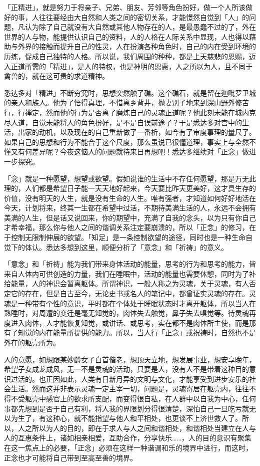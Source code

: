 \documentclass[twoside,openany]{book}
\begin{document}
「正精进」，就是努力于将亲子、兄弟、朋友、芳邻等角色扮好，做一个人所该做好的事，人往往要经由大自然和人类之间的密切关系，才能憬然自觉到「人」的问题，凡认为除了自己就没有大自然或其他人物存在的人，是最愚蠢不过的了，外在世界的人与物，能提供认识自己的资料，人的人格在人际关系中显现，人也得以藉助与外界的接触而提升自己的性灵，人在扮演各种角色时，自己的内在受到环境的历练，促成自己独特的人格。所以说，我们周围的种种，都是上天慈悲的恩赐，迈入正道所需的「精进」，是人的特权，也是神明的恩惠，人之所以为人，且不同于禽兽的，就在这可贵的求道精神。

悉达多对「精进」不断穷究时，思想突然触了礁。这个礁石，就是留在迦毗罗卫城的亲人和族人。他为了悟得真理，不惜离乡背井，抛妻别子地来到深山野外修苦行，行禅定，然而他的行为是否离了磨炼自己的灵魂正道呢？他此刻未能在城内克尽人道，自觉未能将人的角色扮好，是不是自误前途了？于是悉达多对宫中的生活，出家的动机，以及现在的自己重新做了一番析，如今有了审度事理的量尺了。如果自己的思想和行为不能合于这个尺度，那么虽说已很懂道理，事实上与全然不懂又有何差异呢？今夜这恼人的问题就待来日再想吧！悉达多继续对「正念」做进一步探究。

「念」就是一种愿望，想望或欲望。假如说谁的生活中不存任何愿望，那是万无此理的，人们都是希望日子能一天天地好起来，今天要比昨天更美好，这才具生存的价值，没有明天的人生，就是没有生命的人生。唯有强者，才知道如何好好地活在今天，计划将来，终其一生都在希望中过活，不期待美满生活的人，永远不会拥有美满的人生，但是话又说回来，你的期望中，充满了自我的念头，以为只有你自己才希幸福，那么你与他人之间的谐调关系注定要崩溃的，所以「正念」的修习，在于控制无限制伸展的欲望。「知足」是一条控制欲望的途径，同时也是一种生命自觉下的体认。悉达多想到这里，顺便分析了「意念」和「祈祷」的意义。

「意念」和「祈祷」能为我们带来身体活动的能量，思考的行为和思考的能力，皆来自人体内可供创造的力量，我们在睡眠中，活动的能量也需要休憩，同时为了补给能量，人的神识会暂离躯体。所谓神识，一般人称之为灵魂，关于灵魂，有人否定它的存在，但是自古至今，无论史书或名人的笔记中，都曾证实灵魂的存在。灵魂是一种带有个性的意识，平时都在个体处于睡眠状态时才离开躯体，所以当人在熟睡时，对周遭的变迁是毫无知觉的，肉体失去触觉，鼻子失去嗅觉等。待灵魂再度进入肉体，人才能恢复知觉，或讲话、或思考，实在都不是肉体所主使，而是那有了知觉的内在能量所提供的能力。所以，当人行「正念」或祝祷时，自然也不是外在的躯壳所为。

人的意愿，如想跟某妙龄女子白首偕老，想顶天立地，想发展事业，想安享晚年，希望子女成龙成风，无一不是灵魂的活动，只要是人，没有人不是带着这种目的意识过活的。也正因如此，人类有日新月异的文明与文化，才能享受到进步安乐的社会生活。然而这并非表示灵魂一定主宰一切，问题是，灵魂寄居在躯壳内，往往不得不受躯壳中感官上的欲求所支配，而变得很自私，在人群中以自我为中心，任何事都先想到是否于自己有利，将人我的界限划分得很清楚，深怕自己一旦吃亏就无以为生了，有这种心，就不能指望与他人和平相处，也更谈不上济世救人了。所以，人之所以为人的目的，即在于求人与人之间和谐相处，和谐相处当建立在人与人的互惠条件上，诸如相亲相爱，互助合作，分享快乐……，人的目的意识有聚集在这一焦点上的必要，「正念」必须在这样一种谐调和乐的境界中进行，而这时，正念也才可能将自己带到至高至善的境界。
\end{document}
